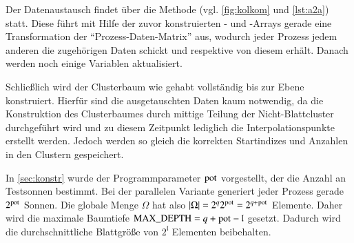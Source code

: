     Der Datenaustausch findet über die Methode  (vgl. \autoref{fig:kolkom} und \autoref{lst:a2a}) statt. Diese führt mit Hilfe der zuvor konstruierten - und 
    -Arrays gerade eine Transformation der ``Prozess-Daten-Matrix'' aus, wodurch jeder Prozess jedem anderen die zugehörigen Daten schickt und respektive von diesem erhält.
    Danach werden noch einige Variablen aktualisiert. 
    
    Schließlich wird der Clusterbaum wie gehabt vollständig bis zur Ebene  konstruiert. Hierfür sind die ausgetauschten Daten kaum notwendig, da die Konstruktion des Clusterbaumes
    durch mittige Teilung der Nicht-Blattcluster durchgeführt wird und zu diesem Zeitpunkt lediglich die Interpolationspunkte erstellt werden. Jedoch werden so gleich die korrekten Startindizes und
    Anzahlen in den Clustern gespeichert.
    
    In \autoref{sec:konstr} wurde der Programmparameter $\tcode{pot}$ vorgestellt, der die Anzahl an Testsonnen bestimmt. Bei der parallelen Variante generiert jeder Prozess gerade $2^{\tcode{pot}}$
    Sonnen. Die globale Menge $\Omega$ hat also $|\Omega| = 2^q 2^\tcode{pot} = 2^{q+\tcode{pot}}$ Elemente. Daher wird die maximale Baumtiefe $\tcode{MAX_DEPTH} = q + \tcode{pot} - \mathfrak{l}$ 
    gesetzt. Dadurch wird die durchschnittliche Blattgröße von $2^\mathfrak{l}$ Elementen beibehalten.
    
